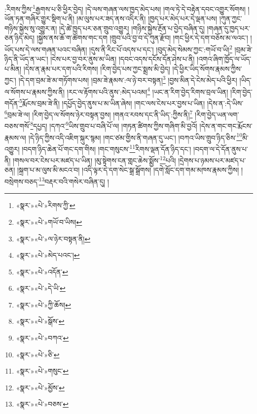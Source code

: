 :རིགས་ཀྱིས་\footnote{«སྣར་»«པེ་»རིགས་ཀྱི་}རྒྱགས་པ་ཅི་ཕྱིར་བྱེད། །དེ་ལས་གཞན་ལས་ཁྱད་མེད་པས། །གལ་ཏེ་དེ་བརྟེན་དབང་འགྱུར་སོགས། །ཡོན་ཏན་གཞིར་གྱུར་སྡིག་པ་ནི། །མ་ལུས་པར་ཟད་ནས་འདིར་ནི། །ཁྱད་པར་མེད་པར་དེ་ལྡན་པས། །ཀུན་ཀྱང་གཉིས་སྐྱེས་སུ་འགྱུར་ན། །དེ་ཚེ་ཁྱད་པར་ཅན་གྲུབ་འགྱུར། །གཉིས་སྐྱེས་རྔོན་པ་བྱེད་བཞིན་དུ། །གཞན་དུ་ཁྱད་པར་ཅན་ཉིད་མེད། །སྐྱེས་ནས་ཆོ་ག་ཚོགས་གང་དག །གྲུབ་པའི་བྱ་བ་དེ་ཀུན་རྫོབ། །གང་ཕྱིར་དེ་དག་བཅོས་མ་ལའང་། །ཡོད་པས་དེ་ལས་གཞན་པའང་བཞིན། །དུས་ནི་རིང་པོ་འདས་པ་དང་། །བུད་མེད་སེམས་ཀྱང་:གཡོ་བ་ཡི།\footnote{«སྣར་»«པེ་»གཡོ་བ་ཡིས།} །བྲམ་ཟེ་ཉིད་ནི་ཡོད་ན་ཡང་། །ངེས་པར་བྱ་བར་ནུས་མ་ཡིན། །དབང་འདས་དངོས་དོན་ཤེས་པ་ནི། །འགའ་ཞིག་ཁྱོད་ལ་ཡོད་པ་མིན། །དེས་ན་རྣམ་པར་དག་པའི་རིགས། །རིག་བྱེད་པས་ཀྱང་སྨྲས་མི་བྱེད། །དེ་ཕྱིར་ཡིད་སོགས་རྣམས་ཀྱིས་ཀྱང་། །དེ་དག་བྲམ་ཟེ་མ་གཏོགས་པས། །བྲམ་ཟེ་རྣམས་:ལ་ཉེ་བར་བསྟན།\footnote{«སྣར་»«པེ་»ལ་ཉེར་བསྟན་ནི།} །བྱས་མིན་དེ་ངེས་མེད་པའི་ཕྱིར། །ཡིད་ལ་སོགས་པ་རྣམས་ཀྱིས་ནི། །རང་ལ་རྟོགས་པའི་ནུས་:མེད་པའམ།\footnote{«སྣར་»«པེ་»མེད་པའང་།} །ཡང་ན་རིག་བྱེད་རིགས་བྲལ་ཡིན། །རིག་བྱེད་གདོན་\footnote{«སྣར་»«པེ་»འདོན་}རྨོངས་བྲམ་ཟེ་ནི། །དཔྱོད་བྱེད་ནུས་པ་མ་ཡིན་ཞེས། །གང་ལས་ངེས་པར་བྱས་པ་ཡིན། །དེས་ན་:དེ་ཡིས་\footnote{«སྣར་»«པེ་»དེ་ཡི་}བྲམ་ཟེ་ལ། །རིག་བྱེད་ལ་སོགས་ཉེར་བསྟན་བྱས། །གནའ་རབས་དང་ནི་ཡིད་:ཀྱིས་ནི།\footnote{«སྣར་»«པེ་»ཀྱི་ཆོས།} །རིག་བྱེད་ཡན་ལག་བཅས་གསོ་\footnote{«སྣར་»«པེ་»སྒོས་}དཔྱད། །དཀའ་\footnote{«སྣར་»«པེ་»བཀའ་}ཡིས་གྲུབ་པ་བཞི་པོ་ལ། །གཏན་ཚིགས་ཀྱིས་གཞིག་མི་བྱའོ། །དེས་ན་གང་གང་རྨོངས་རྣམས་ལ། །དེ་ཉིད་ཀྱིས་འདི་འཇིག་སྐུར་སྙམ། །གང་ཙམ་གྱིས་ནི་གཞན་དུ་ཡང་། །བཀའ་ཡིས་གྲུབ་ཉིད་ཅིས་\footnote{«སྣར་»«པེ་»ཅི་}མི་འགྱུར། །བདག་ཉིད་ཆེན་པོ་གང་དག་གིས། །གང་གསུངས་\footnote{«སྣར་»«པེ་»གསུང་}རིགས་ལྡན་དོན་ཉིད་དང་། །བདག་ལ་དེ་དོན་ནུས་པ་ནི། །གསལ་བར་ངེས་པར་མཛད་པ་ཡིན། །མུ་སྟེགས་ངན་གླང་ཆེས་སྨྱོས་\footnote{«སྣར་»«པེ་»མྱོས་}པའི། །དྲེགས་པ་ཉམས་པར་མཛད་པ་ཅན། །སྐྲག་པ་མ་ལུས་མི་མངའ་བ། །འདི་ལྟར་དེ་དག་སེང་སྒྲ་སྒྲོགས། །དགེ་སློང་དག་གམ་མཁས་རྣམས་ཀྱིས། །བསྲེགས་བཅད་\footnote{«སྣར་»«པེ་»བཅས་}བརྡར་བའི་གསེར་བཞིན་དུ། །
